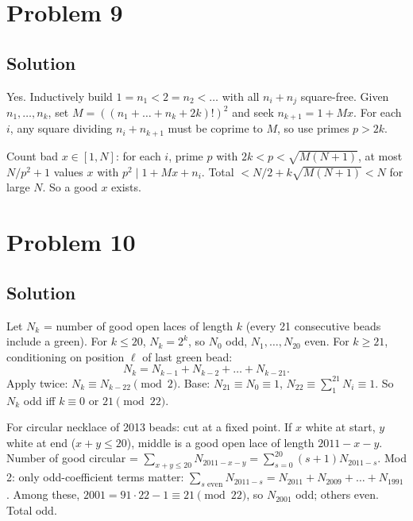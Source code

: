 \documentclass{article}
\begin{document}
\section*{Problem 9}
\subsection*{Solution}
Yes. Inductively build $1 = n_1 < 2 = n_2 < \dots$ with all $n_i + n_j$ square-free. Given $n_1, \dots, n_k$, set $M = ((n_1 + \dots + n_k + 2k)!)^2$ and seek $n_{k+1} = 1 + M x$. For each $i$, any square dividing $n_i + n_{k+1}$ must be coprime to $M$, so use primes $p > 2k$.

Count bad $x \in [1, N]$: for each $i$, prime $p$ with $2k < p < \sqrt{M(N+1)}$, at most $N/p^2 + 1$ values $x$ with $p^2 \mid 1 + Mx + n_i$. Total $< N/2 + k\sqrt{M(N+1)} < N$ for large $N$. So a good $x$ exists.

\section*{Problem 10}
\subsection*{Solution}
Let $N_k$ = number of good open laces of length $k$ (every 21 consecutive beads include a green). For $k \le 20$, $N_k = 2^k$, so $N_0$ odd, $N_1, \dots, N_{20}$ even. For $k \ge 21$, conditioning on position $\ell$ of last green bead:
\[ N_k = N_{k-1} + N_{k-2} + \dots + N_{k-21}. \]
Apply twice: $N_k \equiv N_{k-22} \pmod 2$. Base: $N_{21} \equiv N_0 \equiv 1$, $N_{22} \equiv \sum_{1}^{21} N_i \equiv 1$. So $N_k$ odd iff $k \equiv 0$ or $21 \pmod{22}$.

For circular necklace of 2013 beads: cut at a fixed point. If $x$ white at start, $y$ white at end ($x + y \le 20$), middle is a good open lace of length $2011 - x - y$. Number of good circular = $\sum_{x+y \le 20} N_{2011 - x - y} = \sum_{s=0}^{20}(s+1) N_{2011-s}$. Mod 2: only odd-coefficient terms matter: $\sum_{s \text{ even}} N_{2011-s} = N_{2011} + N_{2009} + \dots + N_{1991}$. Among these, $2001 = 91 \cdot 22 - 1 \equiv 21 \pmod{22}$, so $N_{2001}$ odd; others even. Total odd.
\end{document}

